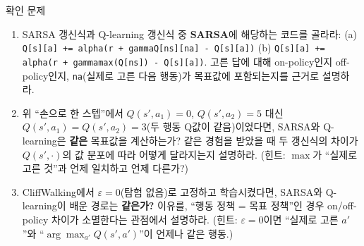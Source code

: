 \begin{frame}{확인 문제}
  \small
  \begin{enumerate}
    \item SARSA 갱신식과 Q-learning 갱신식 중 \textbf{SARSA}에 해당하는
      코드를 골라라:
      (a) \texttt{Q[s][a] += alpha(r + gammaQ[ns][na] - Q[s][a])}
      (b) \texttt{Q[s][a] += alpha(r + gammamax(Q[ns]) - Q[s][a])}.
      고른 답에 대해 on-policy인지 off-policy인지, \texttt{na}(실제로
      고른 다음 행동)가 목표값에 포함되는지를 근거로 설명하라.
    \item 위 ``손으로 한 스텝''에서 $Q(s',a_1)=0$, $Q(s',a_2)=5$ 대신
      \textbf{$Q(s',a_1)=Q(s',a_2)=3$}(두 행동 Q값이 같음)이었다면,
      SARSA와 Q-learning은 \textbf{같은} 목표값을 계산하는가?
      같은 경험을 받았을 때 두 갱신식의 차이가 $Q(s',\cdot)$의 값
      분포에 따라 어떻게 달라지는지 설명하라.
      (힌트: $\max$가 ``실제로 고른 것''과 언제 일치하고 언제 다른가?)
    \item CliffWalking에서 $\varepsilon = 0$(탐험 없음)로 고정하고
      학습시켰다면, SARSA와 Q-learning이 배운 경로는 \textbf{같은가?}
      이유를, ``행동 정책 = 목표 정책''인 경우 on/off-policy 차이가
      소멸한다는 관점에서 설명하라.
      (힌트: $\varepsilon=0$이면 ``실제로 고른 $a'$''와
      ``$\arg\max_{a'}Q(s',a')$''이 언제나 같은 행동.)
  \end{enumerate}
\end{frame}
